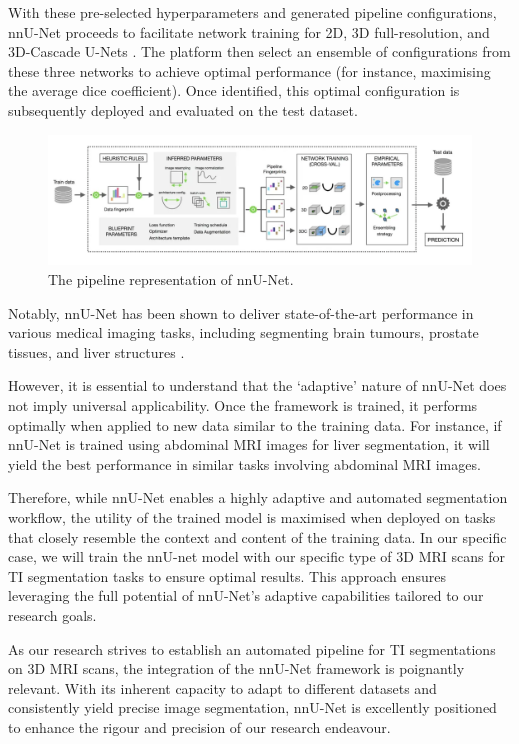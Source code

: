 With these pre-selected hyperparameters and generated pipeline configurations, nnU-Net proceeds to facilitate network training for 2D, 3D full-resolution, and 3D-Cascade U-Nets \cite{isensee2018nnu}. The platform then select an ensemble of configurations from these three networks to achieve optimal performance (for instance, maximising the average dice coefficient). Once identified, this optimal configuration is subsequently deployed and evaluated on the test dataset.

\begin{figure}[htp]
    \centering
    \includegraphics[width=\textwidth]{./figures/nnunet.png}
    \caption{The pipeline representation of nnU-Net.}
    \label{fig:nnu-net}
\end{figure}

Notably, nnU-Net has been shown to deliver state-of-the-art performance in various medical imaging tasks, including segmenting brain tumours, prostate tissues, and liver structures \cite{isensee2019nnu}.

However, it is essential to understand that the `adaptive' nature of nnU-Net does not imply universal applicability. Once the framework is trained, it performs optimally when applied to new data similar to the training data. For instance, if nnU-Net is trained using abdominal MRI images for liver segmentation, it will yield the best performance in similar tasks involving abdominal MRI images.

Therefore, while nnU-Net enables a highly adaptive and automated segmentation workflow, the utility of the trained model is maximised when deployed on tasks that closely resemble the context and content of the training data. In our specific case, we will train the nnU-net model with our specific type of 3D MRI scans for TI segmentation tasks to ensure optimal results. This approach ensures leveraging the full potential of nnU-Net's adaptive capabilities tailored to our research goals.

As our research strives to establish an automated pipeline for TI segmentations on 3D MRI scans, the integration of the nnU-Net framework is poignantly relevant. With its inherent capacity to adapt to different datasets and consistently yield precise image segmentation, nnU-Net is excellently positioned to enhance the rigour and precision of our research endeavour.


